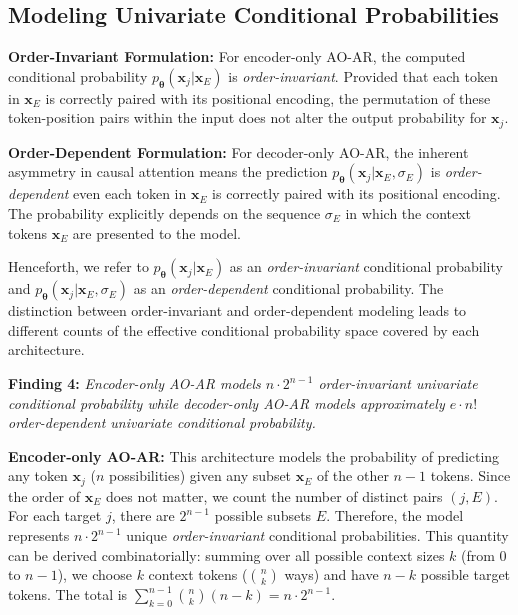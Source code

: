 \subsection{Modeling Univariate Conditional Probabilities}
\label{sec:modeling_conditionals} %
\textbf{Order-Invariant Formulation:} For encoder-only AO-AR, the computed conditional probability $p_{\boldsymbol{\theta}}(\boldsymbol{x}_j | \boldsymbol{x}_{E})$ is \textit{order-invariant}. Provided that each token in $\boldsymbol{x}_{E}$ is correctly paired with its positional encoding, the permutation of these token-position pairs within the input does not alter the output probability for $\boldsymbol{x}_j$.

\textbf{Order-Dependent Formulation:} For decoder-only AO-AR, the inherent asymmetry in causal attention means the prediction $p_{\boldsymbol{\theta}}(\boldsymbol{x}_j | \boldsymbol{x}_{E}, \sigma_{E})$ is \textit{order-dependent} even each token in $\boldsymbol{x}_{E}$ is correctly paired with its positional encoding. The probability explicitly depends on the sequence $\sigma_{E}$ in which the context tokens $\boldsymbol{x}_{E}$ are presented to the model.

Henceforth, we refer to $p_{\boldsymbol{\theta}}(\boldsymbol{x}_j | \boldsymbol{x}_{E})$ as an \textit{order-invariant} conditional probability and $p_{\boldsymbol{\theta}}(\boldsymbol{x}_j | \boldsymbol{x}_{E}, \sigma_{E})$ as an \textit{order-dependent} conditional probability. The distinction between order-invariant and order-dependent modeling leads to different counts of the effective conditional probability space covered by each architecture.
\begin{tcolorbox}[
    enhanced,
    colback=LightGoldenrodYellow!40,
    colframe=black!20,
    arc=2mm, 
    boxrule=0.5pt, 
    boxsep=0mm,
    before skip=2mm,
    after skip=2mm
]
\textbf{Finding 4:} \textit{Encoder-only AO-AR models $n\cdot2^{n-1}$ order-invariant univariate conditional probability while decoder-only AO-AR models approximately $e\cdot n!$ order-dependent univariate conditional probability.}
\end{tcolorbox}
\textbf{Encoder-only AO-AR:} This architecture models the probability of predicting any token $\boldsymbol{x}_j$ ($n$ possibilities) given any subset $\boldsymbol{x}_E$ of the other $n-1$ tokens. Since the order of $\boldsymbol{x}_E$ does not matter, we count the number of distinct pairs $(j, E)$. For each target $j$, there are $2^{n-1}$ possible subsets $E$. Therefore, the model represents $n \cdot 2^{n-1}$ unique \textit{order-invariant} conditional probabilities. This quantity can be derived combinatorially: summing over all possible context sizes $k$ (from $0$ to $n-1$), we choose $k$ context tokens ($\binom{n}{k}$ ways) and have $n-k$ possible target tokens. The total is $\sum_{k=0}^{n-1} \binom{n}{k} (n-k) = n \cdot 2^{n-1}$.

